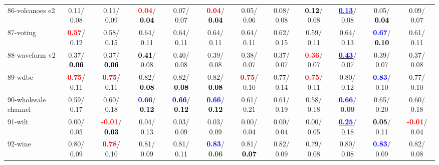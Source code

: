 \begin{table}[h]
\begin{center}
{\begin{tabular}{lc|c|c|c|c|c|c|c|c|c|c}
86-volcanoes e2 &   0.11/  0.08 &   0.11/  0.09 & \textcolor{red}{\textbf{  0.04}}/\textcolor{black}{\textbf{  0.04}} &   0.07/  0.07 & \textcolor{red}{\textbf{  0.04}}/\textcolor{black}{\textbf{  0.04}} &   0.05/  0.06 &   0.08/  0.08 & \textcolor{black}{\textbf{  0.12}}/  0.08 & \underline{\textcolor{blue}{\textbf{  0.13}}}/  0.08 &   0.05/\textcolor{black}{\textbf{  0.04}} &   0.09/  0.07 \\
87-voting & \textcolor{red}{\textbf{  0.57}}/  0.12 &   0.58/  0.15 &   0.64/  0.11 &   0.64/  0.11 &   0.64/  0.11 &   0.64/  0.11 &   0.62/  0.15 &   0.59/  0.11 &   0.64/  0.13 & \textcolor{blue}{\textbf{  0.67}}/\textcolor{black}{\textbf{  0.10}} &   0.61/  0.11 \\
88-waveform v2 &   0.37/\textcolor{black}{\textbf{  0.06}} &   0.37/\textcolor{black}{\textbf{  0.06}} & \textcolor{black}{\textbf{  0.41}}/  0.08 &   0.40/  0.08 &   0.39/  0.08 &   0.38/  0.07 &   0.37/  0.07 & \textcolor{red}{\textbf{  0.36}}/  0.07 & \underline{\textcolor{blue}{\textbf{  0.43}}}/  0.07 &   0.39/  0.07 &   0.37/  0.08 \\
89-wdbc & \textcolor{red}{\textbf{  0.75}}/  0.11 & \textcolor{red}{\textbf{  0.75}}/  0.11 &   0.82/\textcolor{black}{\textbf{  0.08}} &   0.82/\textcolor{black}{\textbf{  0.08}} &   0.82/\textcolor{black}{\textbf{  0.08}} & \textcolor{red}{\textbf{  0.75}}/  0.10 &   0.77/  0.14 & \textcolor{red}{\textbf{  0.75}}/  0.11 &   0.80/  0.12 & \textcolor{blue}{\textbf{  0.83}}/  0.10 &   0.77/  0.10 \\
90-wholesale channel &   0.59/  0.17 &   0.60/  0.18 & \textcolor{blue}{\textbf{  0.66}}/\textcolor{black}{\textbf{  0.12}} & \textcolor{blue}{\textbf{  0.66}}/\textcolor{black}{\textbf{  0.12}} & \textcolor{blue}{\textbf{  0.66}}/\textcolor{black}{\textbf{  0.12}} &   0.61/  0.21 &   0.61/  0.19 &   0.58/  0.18 & \textcolor{blue}{\textbf{  0.66}}/\textcolor{darkgreen}{\textbf{  0.09}} &   0.65/  0.20 &   0.60/  0.18 \\
91-wilt &   0.00/  0.05 & \textcolor{red}{\textbf{ -0.01}}/\textcolor{black}{\textbf{  0.03}} &   0.04/  0.13 &   0.03/  0.09 &   0.03/  0.09 &   0.00/  0.04 &   0.00/  0.04 &   0.00/  0.05 & \underline{\textcolor{blue}{\textbf{  0.25}}}/  0.18 & \textcolor{black}{\textbf{  0.05}}/  0.11 & \textcolor{red}{\textbf{ -0.01}}/  0.04 \\
92-wine &   0.80/  0.09 & \textcolor{red}{\textbf{  0.78}}/  0.10 &   0.81/  0.09 &   0.81/  0.11 & \textcolor{blue}{\textbf{  0.83}}/\textcolor{darkgreen}{\textbf{  0.06}} &   0.81/\textcolor{black}{\textbf{  0.07}} &   0.82/  0.09 &   0.79/  0.08 &   0.80/  0.08 & \textcolor{blue}{\textbf{  0.83}}/  0.09 &   0.82/  0.08 \\ \hline

\end{tabular}}
\end{center}
\end{table}
